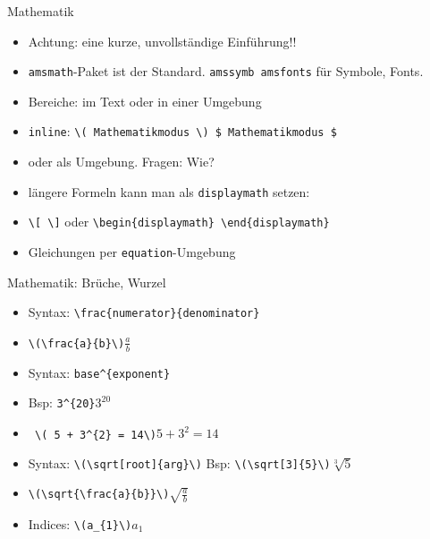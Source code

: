 \begin{frame}[fragile]{Mathematik}
    \begin{itemize}[<+->]
        \item Achtung: eine kurze, unvollständige Einführung!!
        \item \texttt{amsmath}-Paket ist der Standard. \texttt{amssymb amsfonts} für Symbole, Fonts.
        \item Bereiche: im Text oder in einer Umgebung
        \item \texttt{inline}: \lstinline|\( Mathematikmodus \) $ Mathematikmodus $ |
        \item oder als Umgebung. Fragen: Wie?
        \item längere Formeln kann man als \texttt{displaymath} setzen:
        \item \lstinline|\[ \]| oder \lstinline|\begin{displaymath} \end{displaymath}|
        \item Gleichungen per \texttt{equation}-Umgebung
    \end{itemize}
\end{frame}

\begin{frame}[fragile]{Mathematik: Brüche, Wurzel}
    \begin{itemize}[<+->]
        \item Syntax: \lstinline|\frac{numerator}{denominator}|
        \item \lstinline|\(\frac{a}{b}\)|\is \(\frac{a}{b}\)
        \item Syntax: \lstinline|base^{exponent}| 
        \item Bsp: \lstinline|3^{20}|\is \(3^{20}\)
        \item \lstinline| \( 5 + 3^{2} = 14\)|\is \( 5 + 3^{2} = 14\)
        \item Syntax: \lstinline|\(\sqrt[root]{arg}\)| Bsp: \lstinline|\(\sqrt[3]{5}\)|\is \(\sqrt[3]{5}\)
        \item \lstinline|\(\sqrt{\frac{a}{b}}\)|\is \(\sqrt{\frac{a}{b}}\)
        \item Indices: \lstinline|\(a_{1}\)|\is \(a_{1}\)
    \end{itemize}
\end{frame}

